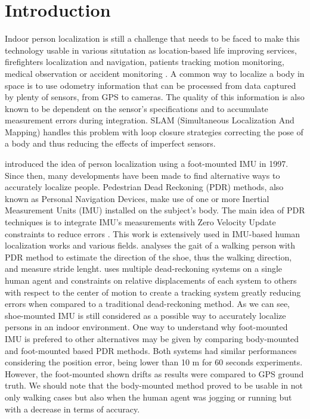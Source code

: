 
\section{Introduction}\label{sec:intro}

Indoor person localization is still a challenge that needs to be faced to make this technology usable in various situtation as location-based life improving services, firefighters localization and navigation, patients tracking 
motion monitoring, medical observation or accident monitoring \cite{pourhomayoun2012spatial}.
A common way to localize a body in space is to use odometry information that can be processed from data captured by plenty of sensors, from GPS to cameras.
The quality of this information is also known to be dependent on the sensor's specifications and to accumulate measurement errors during integration. 
SLAM (Simultaneous Localization And Mapping) handles this problem with loop closure strategies correcting the pose of a body and thus reducing the effects of imperfect sensors.

\cite{hutchings1998system} introduced the idea of person localization using a foot-mounted IMU in 1997. Since then, many developments have been made to find alternative ways to accurately localize people.
Pedestrian Dead Reckoning (PDR) methods, also known as Personal Navigation Devices, make use of one or more Inertial Measurement Units (IMU) installed on the subject's body.
The main idea of PDR techniques is to integrate IMU's measurements with Zero Velocity Update constraints to reduce errors \cite{ojeda2007personal}.
This work is extensively used in IMU-based human localization works and various fields. \cite{kwanmuang2015phd} analyses the gait of a walking person with PDR method to estimate the direction of the shoe, thus the walking direction, and
measure stride lenght. \cite{jin2011robust} uses multiple dead-reckoning systems on a single human agent and constraints on relative displacements of each system to others with respect to the center of motion to create a tracking system
greatly reducing errors when compared to a traditional dead-reckoning method. As we can see, shoe-mounted IMU is still considered as a possible way to accurately localize persons in an indoor environment. One way to understand why
foot-mounted IMU is prefered to other alternatives may be given by \cite{groves2007inertial} comparing body-mounted and foot-mounted based PDR methods. 
Both systems had similar performances considering the position error, being lower than 10 m for 60 seconds experiments. However, the foot-mounted shown drifts as results were compared
to GPS ground truth. We should note that the body-mounted method proved to be usable in not only walking cases but also when the human agent was jogging or running but with a decrease in terms of accuracy.

